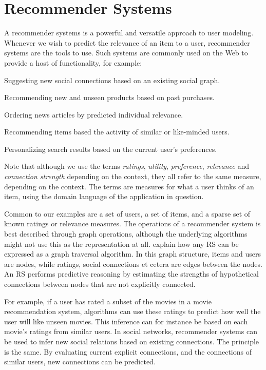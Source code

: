 \section{Recommender Systems}
\label{sec:recommender}

A recommender systems is a powerful and versatile approach to user modeling.
Whenever we wish to predict the relevance of an item to a user, recommender systems are the tools to use.
Such systems are commonly used on the Web to provide a host of functionality,
for example:

\begin{itemize*}
  \item Suggesting new social connections based on an existing social graph.
  \item Recommending new and unseen products based on past purchases.
  \item Ordering news articles by predicted individual relevance.
  \item Recommending items based the activity of similar or like-minded users.
  \item Personalizing search results based on the current user's preferences.
\end{itemize*}

Note that although we use the terms 
\emph{ratings}, \emph{utility}, \emph{preference}, \emph{relevance} and \emph{connection strength} depending on the context, 
they all refer to the same measure, depending on the context. 
The terms are measures for what a user thinks of an item, using the domain language of the application in question.

Common to our examples are a set of users, a set of items, and a sparse set of known ratings or relevance measures.
The operations of a recommender system is best described through graph operations, 
although the underlying algorithms might not use this as the representation at all.
\cite{Mirza2003} explain how any RS can be expressed as a graph traversal algorithm.
In this graph structure, items and users are nodes, while ratings, social connections et cetera are edges between the nodes.
An RS performs predictive reasoning by estimating the strengths of hypothetical connections between nodes that are not explicitly connected.

For example, if a user has rated a subset of the movies in a movie recommendation system, 
algorithms can use these ratings to predict how well the user will like unseen movies.
This inference can for instance be based on each movie's ratings from similar users.
In social networks, recommender systems can be used to infer new social relations 
based on existing connections. The principle is the same. By evaluating current explicit
connections, and the connections of similar users, new connections can be predicted.

